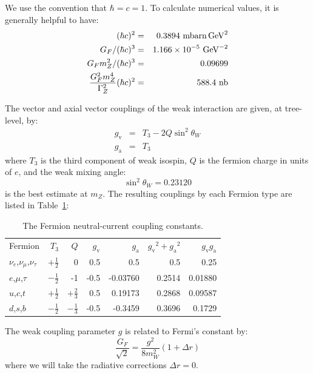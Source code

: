 \documentclass[12pt]{article}
\newcommand{\gv} {\ensuremath{g_{\mathrm v}}}
\newcommand{\ga} {\ensuremath{g_{\mathrm a}}}
\newcommand{\GeV} {\ensuremath{\mathrm{Ge\kern -0.08em V}}}
\begin{document}
We use the convention that $\hbar = c = 1$.  To calculate numerical values, it is generally helpful to have:
\begin{eqnarray}
(\hbar c)^2 &=& 0.3894~{\rm mbarn}\,\GeV^2 \label{eqn:hcs}\\
G_F/(\hbar c)^3 &=& 1.166\times10^{-5}~\GeV^{-2} \notag \\
G_F m_Z^2/(\hbar c)^3 &=& 0.09699 \notag \\
\frac{G_F^2 m_Z^4}{\Gamma_Z^2}(\hbar c)^2 &=& 588.4~{\rm nb} \notag 
\end{eqnarray}

The vector and axial vector couplings of the weak interaction are given, at tree-level, by:
\begin{eqnarray*}
\gv &=& T_3 - 2 Q \sin^2\theta_W\\
\ga &=& T_3
\end{eqnarray*}
where $T_3$ is the third component of weak isospin, $Q$ is the fermion charge in units of $e$, and the weak mixing angle:
\begin{equation}
\sin^2 \theta_W = 0.23120
\end{equation}
is the best estimate at $m_Z$.  The resulting couplings by each Fermion type are listed in Table~\ref{tbl:gva}:
\begin{table}[htbp]
\begin{center}
\caption{ \label{tbl:gva} The Fermion neutral-current coupling constants.}
\begin{tabular}{lrrrrrr}
Fermion & $T_3$ & $Q$ & $\gv$ & $\ga$ & $\gv^2 + \ga^2$  & $\gv\ga$\\
$\nu_e$,$\nu_\mu$,$\nu_\tau$ & $+\frac{1}{2}$ &0 &  0.5 & 0.5 & 0.5 & 0.25\\
$e$,$\mu$,$\tau$ & $-\frac{1}{2}$ & -1                     & -0.5 &  -0.03760 & 0.2514 & 0.01880\\
$u$,$c$,$t$ &  $+\frac{1}{2}$ &  $+\frac{2}{3}$ &  0.5 &  0.19173 &  0.2868 & 0.09587\\
$d$,$s$,$b$ &  $-\frac{1}{2}$ &  $-\frac{1}{3}$ &  -0.5 &  -0.3459 &  0.3696 & 0.1729\\
\end{tabular}
\end{center}
\end{table}

The weak coupling parameter $g$ is related to Fermi's constant by:
\begin{displaymath}
\frac{G_F}{\sqrt{2}}=\frac{g^2}{8m_W^2}(1+\Delta r)
\end{displaymath}
where we will take the radiative corrections $\Delta r = 0$.
\end{document}
